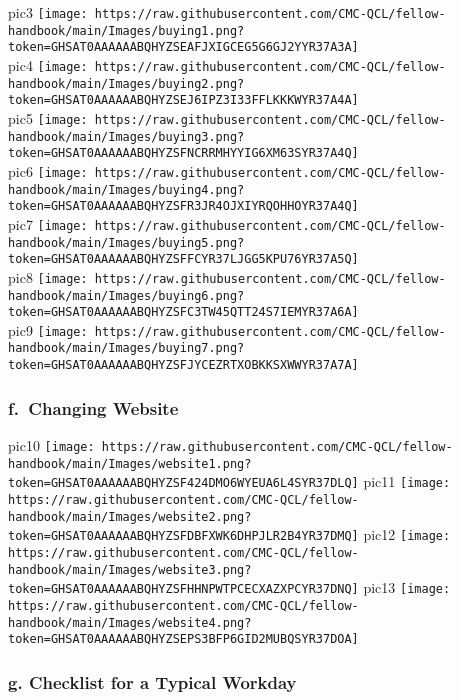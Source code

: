 \documentclass[
]{book}
\begin{document}
pic3
\texttt{[image: https://raw.githubusercontent.com/CMC-QCL/fellow-handbook/main/Images/buying1.png?token=GHSAT0AAAAAABQHYZSEAFJXIGCEG5G6GJ2YYR37A3A]}\\
pic4
\texttt{[image: https://raw.githubusercontent.com/CMC-QCL/fellow-handbook/main/Images/buying2.png?token=GHSAT0AAAAAABQHYZSEJ6IPZ3I33FFLKKKWYR37A4A]}\\
pic5
\texttt{[image: https://raw.githubusercontent.com/CMC-QCL/fellow-handbook/main/Images/buying3.png?token=GHSAT0AAAAAABQHYZSFNCRRMHYYIG6XM63SYR37A4Q]}\\
pic6
\texttt{[image: https://raw.githubusercontent.com/CMC-QCL/fellow-handbook/main/Images/buying4.png?token=GHSAT0AAAAAABQHYZSFR3JR4OJXIYRQOHHOYR37A4Q]}\\
pic7
\texttt{[image: https://raw.githubusercontent.com/CMC-QCL/fellow-handbook/main/Images/buying5.png?token=GHSAT0AAAAAABQHYZSFFCYR37LJGG5KPU76YR37A5Q]}\\
pic8
\texttt{[image: https://raw.githubusercontent.com/CMC-QCL/fellow-handbook/main/Images/buying6.png?token=GHSAT0AAAAAABQHYZSFC3TW45QTT24S7IEMYR37A6A]}\\
pic9
\texttt{[image: https://raw.githubusercontent.com/CMC-QCL/fellow-handbook/main/Images/buying7.png?token=GHSAT0AAAAAABQHYZSFJYCEZRTXOBKKSXWWYR37A7A]}

\hypertarget{f.-changing-website}{%
\subsubsection{\texorpdfstring{f.~Changing Website }{f.~Changing Website }}\label{f.-changing-website}}

pic10
\texttt{[image: https://raw.githubusercontent.com/CMC-QCL/fellow-handbook/main/Images/website1.png?token=GHSAT0AAAAAABQHYZSF424DMO6WYEUA6L4SYR37DLQ]}
pic11
\texttt{[image: https://raw.githubusercontent.com/CMC-QCL/fellow-handbook/main/Images/website2.png?token=GHSAT0AAAAAABQHYZSFDBFXWK6DHPJLR2B4YR37DMQ]}
pic12
\texttt{[image: https://raw.githubusercontent.com/CMC-QCL/fellow-handbook/main/Images/website3.png?token=GHSAT0AAAAAABQHYZSFHHNPWTPCECXAZXPCYR37DNQ]}
pic13
\texttt{[image: https://raw.githubusercontent.com/CMC-QCL/fellow-handbook/main/Images/website4.png?token=GHSAT0AAAAAABQHYZSEPS3BFP6GID2MUBQSYR37DOA]}

\hypertarget{g.-checklist-for-a-typical-workday}{%
\subsubsection{\texorpdfstring{g. Checklist for a Typical Workday }{g. Checklist for a Typical Workday }}\label{g.-checklist-for-a-typical-workday}}
\end{document}
